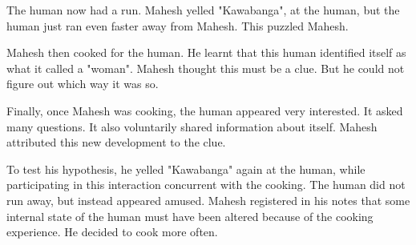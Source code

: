 The human now had a run. Mahesh yelled "Kawabanga", at the human, but the human just ran even faster away from Mahesh. This puzzled Mahesh.

Mahesh then cooked for the human. He learnt that this human identified itself as what it called a "woman". Mahesh thought this must be a clue. But he could not figure out which way it was so.

Finally, once Mahesh was cooking, the human appeared very interested. It asked many questions. It also voluntarily shared information about itself. Mahesh attributed this new development to the clue.

To test his hypothesis, he yelled "Kawabanga" again at the human, while participating in this interaction concurrent with the cooking. The human did not run away, but instead appeared amused. Mahesh registered in his notes that some internal state of the human must have been altered because of the cooking experience. He decided to cook more often.
